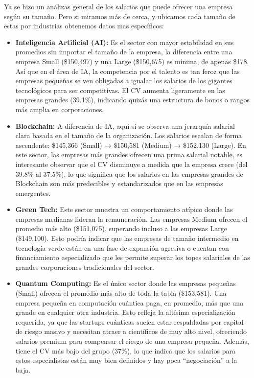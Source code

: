 \documentclass[oneside,11pt]{Latex/Classes/PhDthesisPSnPDF}
\begin{document}
Ya se hizo un análizas general de los salarios que puede ofrecer una
empresa según su tamaño. Pero si miramos más de cerca, y ubicamos cada
tamaño de estas por industrias obtenemos datos mas específicos:

\begin{itemize}
\item
  \textbf{Inteligencia Artificial (AI):} Es el sector con mayor
  estabilidad en sus promedios sin importar el tamaño de la empresa, la
  diferencia entre una empresa Small (\$150,497) y una Large (\$150,675)
  es mínima, de apenas \$178. Así que en el área de IA, la competencia
  por el talento es tan feroz que las empresas pequeñas se ven obligadas
  a igualar los salarios de los gigantes tecnológicos para ser
  competitivas. El CV aumenta ligeramente en las empresas grandes
  (39.1\%), indicando quizás una estructura de bonos o rangos más amplia
  en corporaciones.
\item
  \textbf{Blockchain:} A diferencia de IA, aquí sí se observa una
  jerarquía salarial clara basada en el tamaño de la organización. Los
  salarios escalan de forma ascendente: \$145,366 (Small) → \$150,581
  (Medium) → \$152,130 (Large). En este sector, las empresas más grandes
  ofrecen una prima salarial notable, es interesante observar que el CV
  disminuye a medida que la empresa crece (del 39.8\% al 37.5\%), lo que
  significa que los salarios en las empresas grandes de Blockchain son
  más predecibles y estandarizados que en las empresas emergentes.
\item
  \textbf{Green Tech:} Este sector muestra un comportamiento atípico
  donde las empresas medianas lideran la remuneración. Las empresas
  Medium ofrecen el promedio más alto (\$151,075), superando incluso a
  las empresas Large (\$149,100). Esto podría indicar que las empresas
  de tamaño intermedio en tecnología verde están en una fase de
  expansión agresiva o cuentan con financiamiento especializado que les
  permite superar los topes salariales de las grandes corporaciones
  tradicionales del sector.
\item
  \textbf{Quantum Computing:} Es el único sector donde las empresas
  pequeñas (Small) ofrecen el promedio más alto de toda la tabla
  (\$153,581). Una empresa pequeña en computación cuántica paga, en
  promedio, más que una grande en cualquier otra industria. Esto refleja
  la altísima especialización requerida, ya que las startups cuánticas
  suelen estar respaldadas por capital de riesgo masivo y necesitan
  atraer a científicos de muy alto nivel, ofreciendo salarios premium
  para compensar el riesgo de una empresa pequeña. Además, tiene el CV
  más bajo del grupo (37\%), lo que indica que los salarios para estos
  especialistas están muy bien definidos y hay poca ``negociación'' a la
  baja.
\end{itemize}
\end{document}

